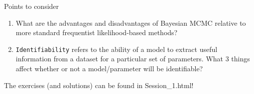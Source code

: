 \documentclass[
  ignorenonframetext,
  aspectratio=169,
]{beamer}
\begin{document}
\begin{frame}[fragile]{Points to consider}
\protect\hypertarget{points-to-consider}{}
\begin{enumerate}
\item
  What are the advantages and disadvantages of Bayesian MCMC relative to
  more standard frequentist likelihood-based methods?
\item
  \texttt{Identifiability} refers to the ability of a model to extract
  useful information from a dataset for a particular set of parameters.
  What 3 things affect whether or not a model/parameter will be
  identifiable?
\end{enumerate}

The exercises (and solutions) can be found in Session\_1.html!

\begin{comment}

## Exercise 1 {.fragile}

Follow these steps to run the basic JAGS model given above:

- Create a new text file in RStudio by clicking on `File` then `New File` then `Text file`

- Copy the following model definition into this text file:

\scriptsize

```
model{
  # Likelihood part:
  Positives ~ dbinom(prevalence, N)
  
  # Prior part:
  prevalence ~ dbeta(1, 1)
  
  # Hooks for automatic integration with R:
  #data# Positives, N
  #monitor# prevalence
  #inits# prevalence
}
```

\normalsize

- Save the file as `basicjags.txt` in a folder where you can find it again

- Set your R working directory to the same folder, by clicking on `Session` then `Set Working Directory` then `Choose Directory` and choosing the folder location

- Create a new R file in RStudio by clicking on `File` then `New File` then `R script`, and save the file as e.g. `Session 1 exercises.R` in the same folder

- Copy and paste the following R code into this R script file:

\scriptsize

```r
library('runjags')

# data to be retrieved by runjags
Positives <- 70
N <- 100


\end{comment}
\end{frame}
\end{document}
